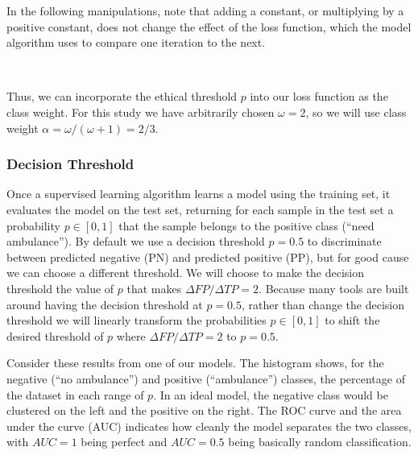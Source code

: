 In the following manipulations, note that adding a constant, or multiplying by a positive constant, does not change the effect of the loss function, which the model algorithm uses to compare one iteration to the next.

\

\hfil {}

Thus, we can incorporate the ethical threshold $p$ into our loss function as the class weight.  For this study we have arbitrarily chosen $\omega = 2$, so we will use class weight $\alpha = \omega/(\omega+1) = 2/3$.

\subsubsection{Decision Threshold}

Once a supervised learning algorithm learns a model using the training set, it evaluates the model on the test set, returning for each sample in the test set a probability $p\in [0,1]$ that the sample belongs to the positive class (``need ambulance'').  By default we use a decision threshold $p=0.5$ to discriminate between predicted negative (PN) and predicted positive (PP), but for good cause we can choose a different threshold.  We will choose to make the decision threshold the value of $p$ that makes $\Delta FP/\Delta TP = 2$.  Because many tools are built around having the decision threshold at $p=0.5$, rather than change the decision threshold we will linearly transform the probabilities $p \in [0,1]$ to shift the desired threshold of $p$ where $\Delta FP/\Delta TP = 2$ to $p=0.5$.  

Consider these results from one of our models.  The histogram shows, for the negative (``no ambulance'') and positive (``ambulance'') classes, the percentage of the dataset in each range of $p$.  In an ideal model, the negative class would be clustered on the left and the positive on the right.  The ROC curve and the area under the curve (AUC) indicates how cleanly the model separates the two classes, with $AUC=1$ being perfect and $AUC=0.5$ being basically random classification.


